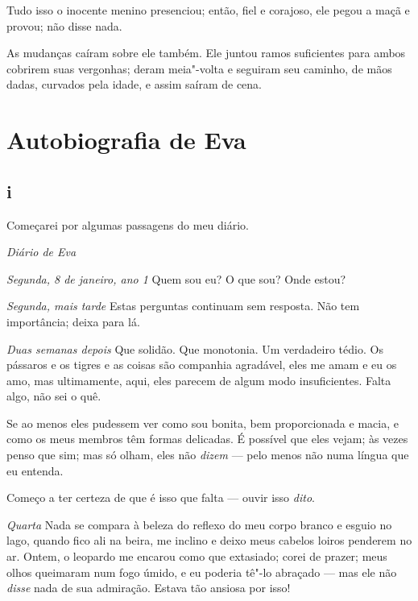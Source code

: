 Tudo isso o inocente menino presenciou; então, fiel e corajoso, ele
pegou a maçã e provou; não disse nada.

As mudanças caíram sobre ele também. Ele juntou ramos suficientes
para ambos cobrirem suas vergonhas; deram meia"-volta e seguiram seu
caminho, de mãos dadas, curvados pela idade, e assim saíram de cena.


\chapter{Autobiografia de Eva}

\section{i}

\begin{center}
Começarei por algumas passagens do meu diário.
\end{center}

\begin{center}
\textit{Diário de Eva}
\end{center}


\textit{Segunda, 8 de janeiro, ano 1} Quem sou eu? O que sou? Onde estou?

\textit{Segunda, mais tarde} Estas perguntas continuam sem resposta. Não tem importância; deixa para lá.

\textit{Duas semanas depois} Que solidão. Que monotonia. Um verdadeiro tédio. Os pássaros e os tigres
e as coisas são companhia agradável, eles me amam e eu os amo, mas ultimamente, aqui, eles parecem
de algum modo insuficientes. Falta algo, não sei o quê.

Se ao menos eles pudessem ver como sou bonita, bem proporcionada e macia, e como os
meus membros têm formas delicadas. É possível que eles vejam; às vezes penso que sim; mas só
olham, eles não \textit{dizem} --- pelo menos não numa língua que eu entenda.

Começo a ter certeza de que é isso que falta --- ouvir isso \textit{dito}.

\textit{Quarta} Nada se compara à beleza do reflexo do meu corpo branco e esguio no lago,
quando fico ali na beira, me inclino e deixo meus cabelos loiros penderem no ar.
Ontem, o leopardo me encarou como que extasiado; corei de prazer;
meus olhos queimaram num fogo úmido, e eu poderia tê"-lo abraçado --- mas ele não \textit{disse}
nada de sua admiração. Estava tão ansiosa por isso!

